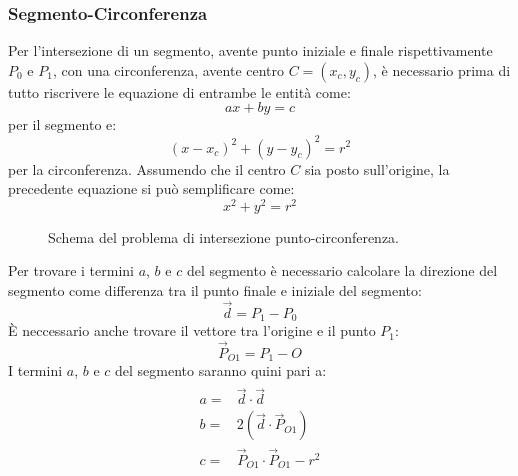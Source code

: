 \subsubsection{Segmento-Circonferenza}
Per l'intersezione di un segmento, avente punto iniziale e finale rispettivamente $P_0$ e $P_1$, con una circonferenza, avente centro $C=(x_c,y_c)$, è necessario prima di tutto riscrivere le equazione di entrambe le entità come:
\begin{equation}
ax+by=c
\label{eqretta}
\end{equation}
per il segmento e:
\begin{equation}
(x-x_c)^2 + (y-y_c)^2 = r^2
\end{equation}
per la circonferenza. Assumendo che il centro $C$ sia posto sull'origine, la precedente equazione si può semplificare come:
\begin{equation}
x^2 + y^2 = r^2
\label{eqcircle}
\end{equation}
\begin{figure}[h]
	\centering
	\caption{Schema del problema di intersezione punto-circonferenza.}
\end{figure}
Per trovare i termini $a$, $b$ e $c$ del segmento è necessario calcolare la direzione del segmento come differenza tra il punto finale e iniziale del segmento:
\begin{equation}
\vec{d} = P_1 - P_0 
\end{equation}
È neccessario anche trovare il vettore tra l'origine e il punto $P_1$:
\begin{equation}
\vec{P}_{O1} = P_1 - O
\end{equation}
I termini $a$, $b$ e $c$ del segmento saranno quini pari a:
\begin{equation}
\begin{aligned}
	\begin{split}
		a =& \vec{d} \cdot \vec{d} \\
		b =& 2 (\vec{d} \cdot \vec{P}_{O1}) \\
		c =& \vec{P}_{O1} \cdot \vec{P}_{O1} - r^2
	\end{split}
\end{aligned}
\end{equation}
